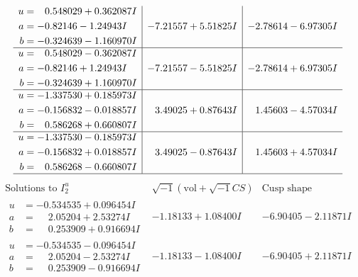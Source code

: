 \documentclass[1p]{elsarticle_modified}
\theoremstyle{definition}
\newcommand{\I}{\sqrt{-1}}
\begin{document}
$$\begin{array}{c|c|c}
\begin{aligned}
u &= \phantom{-}0.548029 + 0.362087 I \\
a &= -0.82146 - 1.24943 I \\
b &= -0.324639 - 1.160970 I\end{aligned}
 & -7.21557 + 5.51825 I & -2.78614 - 6.97305 I \\ \hline\begin{aligned}
u &= \phantom{-}0.548029 - 0.362087 I \\
a &= -0.82146 + 1.24943 I \\
b &= -0.324639 + 1.160970 I\end{aligned}
 & -7.21557 - 5.51825 I & -2.78614 + 6.97305 I \\ \hline\begin{aligned}
u &= -1.337530 + 0.185973 I \\
a &= -0.156832 - 0.018857 I \\
b &= \phantom{-}0.586268 + 0.660807 I\end{aligned}
 & \phantom{-}3.49025 + 0.87643 I & \phantom{-}1.45603 - 4.57034 I \\ \hline\begin{aligned}
u &= -1.337530 - 0.185973 I \\
a &= -0.156832 + 0.018857 I \\
b &= \phantom{-}0.586268 - 0.660807 I\end{aligned}
 & \phantom{-}3.49025 - 0.87643 I & \phantom{-}1.45603 + 4.57034 I\\
 \hline 
 \end{array}$$\newpage$$\begin{array}{c|c|c}  
\text{Solutions to }I^u_{2}& \I (\text{vol} + \sqrt{-1}CS) & \text{Cusp shape}\\
 \hline 
\begin{aligned}
u &= -0.534535 + 0.096454 I \\
a &= \phantom{-}2.05204 + 2.53274 I \\
b &= \phantom{-}0.253909 + 0.916694 I\end{aligned}
 & -1.18133 + 1.08400 I & -6.90405 - 2.11871 I \\ \hline\begin{aligned}
u &= -0.534535 - 0.096454 I \\
a &= \phantom{-}2.05204 - 2.53274 I \\
b &= \phantom{-}0.253909 - 0.916694 I\end{aligned}
 & -1.18133 - 1.08400 I & -6.90405 + 2.11871 I \\ \hline\begin{aligned}

\end{aligned}
\end{array}$$
\end{document}
